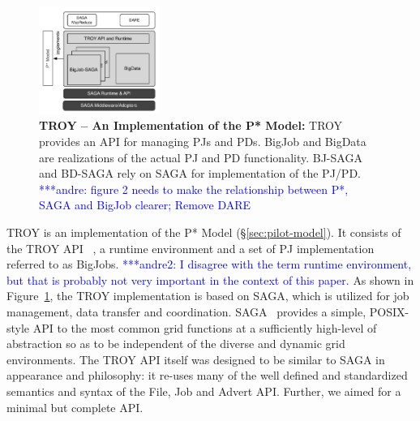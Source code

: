\documentclass[conference,final]{IEEEtran}
\newcommand{\jhanote}[1]{ {\textcolor{red} { ***shantenu: #1 }}}
\newcommand{\alnote}[1]{ {\textcolor{blue} { ***andre: #1 }}}
\newcommand{\amnote}[1]{ {\textcolor{blue} { ***andre2: #1 }}}
\newcommand{\msnote}[1]{ {\textcolor{cyan} { ***mark: #1 }}}
\newcommand{\alnote}[1]{}
\newcommand{\amnote}[1]{}
\newcommand{\jhanote}[1]{}
\newcommand{\msnote}[1]{}
\begin{document}


\begin{figure}[t]
	\centering
		\includegraphics[width=0.35\textwidth]{figures/pstar_troy.pdf}
	\caption{\textbf{TROY -- An Implementation of the P* Model:}  TROY 
	provides an API for managing PJs and PDs. BigJob and BigData are 
	realizations of the actual PJ and PD functionality. BJ-SAGA and BD-SAGA 
	rely on SAGA for implementation of the PJ/PD.\alnote{figure 2 needs to 
	make the relationship between P*, SAGA and BigJob clearer; Remove DARE
	}
	}
	\label{fig:figures_pstar_troy}
\end{figure}

TROY is an implementation of the P* Model (\S\ref{sec:pilot-model}). It
consists of the TROY API ~\cite{troy}, a runtime environment and a set of PJ
implementation referred to as BigJobs. \amnote{I disagree with the term
runtime environment, but that is probably not very important in the context of
this paper.} As shown in Figure~\ref{fig:figures_pstar_troy}, the TROY
implementation is based on SAGA, which is utilized for job management, data
transfer and coordination. SAGA~\cite{saga_url,saga_gfd90} provides a simple,
POSIX-style API to the most common grid functions at a sufficiently high-level
of abstraction so as to be independent of the diverse and dynamic grid
environments. The TROY API itself was designed to be similar to SAGA in
appearance and philosophy: it re-uses many of the well defined and
standardized semantics and syntax of the File, Job and Advert API. Further, we
aimed for a minimal but complete API.%
\end{document}
